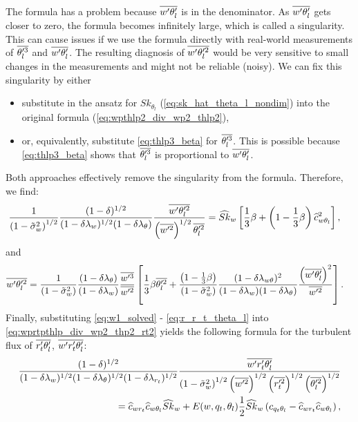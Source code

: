 The formula has a problem because $\overline{w' \theta_l'}$ is in the denominator.
As $\overline{w' \theta_l'}$ gets closer to zero, the formula becomes infinitely large, which is called a singularity.
This can cause issues if we use the formula directly with real-world measurements of $\overline{\theta_l'^3}$ and $\overline{w' \theta_l'}$.
The resulting diagnosis of $\overline{w' \theta_l'^2}$ would be very sensitive to small changes in the measurements
and might not be reliable (noisy).
We can fix this singularity by either
\begin{itemize}
    \item substitute in the ansatz for $Sk_{\theta_l}$ (\cref{eq:sk_hat_theta_l_nondim})
    into the original formula (\cref{eq:wpthlp2_div_wp2_thlp2}),
    \item or, equivalently, substitute \cref{eq:thlp3_beta} for $\overline{\theta_l'^3}$.
    This is possible because \cref{eq:thlp3_beta} shows that $\overline{\theta_l'^3}$ is proportional to $\overline{w' \theta_l'}$.
\end{itemize}
Both approaches effectively remove the singularity from the formula.
Therefore, we find:
\begin{align}
    \label{eq:wpthlp2_div_wp2_thlp2_sk_w}
    \frac{1}{\left( 1 - \tilde{\sigma}_w^2 \right)^{1/2}} \frac{(1-\delta)^{1/2}}{(1-\delta \lambda_w)^{1/2} (1-\delta \lambda_\theta)} \frac{\overline{w'\theta_l'^2}}{\left(\overline{w'^2}\right)^{1/2} \overline{\theta_l'^2}}
    &= \widehat{Sk}_w \left[\frac{1}{3} \beta + \left(1 - \frac{1}{3} \beta \right) \widehat{c}_{w\theta_l}^2 \right],
\end{align}
and
\begin{align}
    \label{eq:wpthlp2_beta}
    \overline{w'\theta_l'^2}
    &= \frac{1}{\left( 1 - \tilde{\sigma}_w^2 \right)} \frac{(1-\delta \lambda_\theta)}{(1-\delta \lambda_w)}
    \frac{\overline{w'^3}}{\overline{w'^2}}
    \left[ \frac{1}{3} \beta \overline{\theta_l'^2}
    + \frac{\left( 1-\frac{1}{3} \beta \right)}{\left( 1 - \tilde{\sigma}_w^2 \right)}
    \frac{(1-\delta \lambda_{w \theta})^2}{(1-\delta \lambda_w)(1-\delta \lambda_\theta)}
    \frac{\left( \overline{w'\theta_l'} \right)^2}{\overline{w'^2}}
    \right].
\end{align}
Finally, substituting \cref{eq:w1_solved} - \cref{eq:r_r_t_theta_l} into \cref{eq:wprtpthlp_div_wp2_thp2_rt2}
yields the following formula for the turbulent flux of $\overline{r_t' \theta_l'}$, $\overline{w' r_t' \theta_l'}$:
\begin{align}
    \label{eq:wprtpthlp_div_wp2_thp2_rt2_sk_w}
    \frac{(1-\delta)^{1/2}}{(1-\delta \lambda_w)^{1/2}
        (1-\delta \lambda_\theta)^{1/2}
        (1-\delta \lambda_{r_t})^{1/2}}
    \frac{\overline{w' r_t' \theta_l'}}{\left( 1 - \tilde{\sigma}_w^2 \right)^{1/2}
        \left( \overline{w'^2} \right)^{1/2}
        \left(\overline{r_t'^2}\right)^{1/2} \left(\overline{\theta_l'^2}\right)^{1/2}} \nonumber \\
    = \widehat{c}_{wr_t} \widehat{c}_{w\theta_l} \widehat{Sk}_w
    + E(w,q_t,\theta_l) \frac{1}{2} \widehat{Sk}_w
    \left( c_{q_t\theta_l} - \widehat{c}_{wr_t} \widehat{c}_{w\theta_l}\right),
\end{align}
